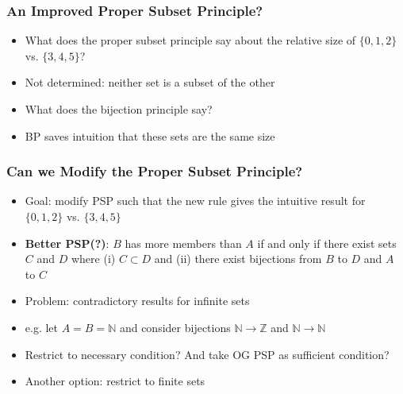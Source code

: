 \begin{frame}
\frametitle{An Improved Proper Subset Principle?}

\begin{itemize}[<+->]

\item What does the proper subset principle say about the relative size of $\{ 0, 1, 2 \}$ vs. $\{3, 4, 5 \}$? 


\item[] Not determined: neither set is a subset of the other 

\item What does the bijection principle say? 

\item[] BP saves intuition that these sets are the same size 

\end{itemize}
\end{frame}

\begin{frame}
\frametitle{Can we Modify the Proper Subset Principle?}

\begin{itemize}[<+->]

\item Goal: modify PSP such that the new rule gives the intuitive result for $\{ 0, 1, 2 \}$ vs. $\{3, 4, 5 \}$

\item \textbf{Better PSP(?)}: $B$ has more members than $A$ if and only if there exist sets $C$ and $D$ where (i) $C \subset D$ and (ii) there exist bijections from $B$ to $D$ and $A$ to $C$

\item Problem: contradictory results for infinite sets
\item[] e.g. let $A= B = \mathbb{N}$ and consider bijections $\mathbb{N} \rightarrow \mathbb{Z}$ and $\mathbb{N} \rightarrow \mathbb{N}$

\item Restrict to necessary condition? And take OG PSP as sufficient condition? 

\item Another option: restrict to finite sets 


\end{itemize}
\end{frame}

